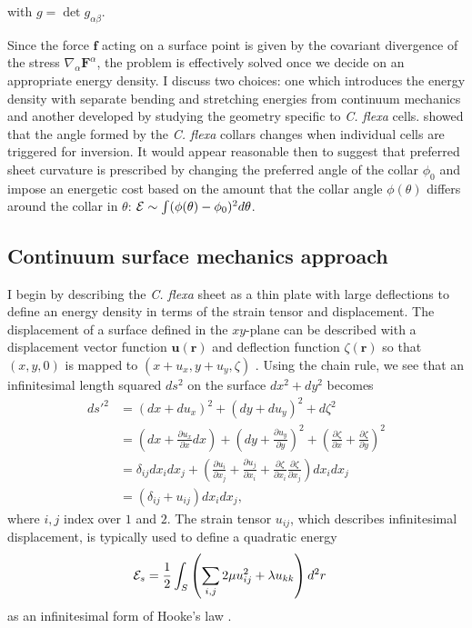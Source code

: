 \noindent with $g = \det{g_{\alpha\beta}}$.

Since the force $\bm{f}$ acting on a surface point is given by the covariant divergence of the stress $\nabla_\alpha \bm{F}^\alpha$, the problem is effectively solved once we decide on an appropriate energy density. 
I discuss two choices: one which introduces the energy density with separate bending and stretching energies from continuum mechanics and another developed by studying the geometry specific to \textit{C. flexa} cells.
\citet{brunet2019} showed that the angle formed by the \textit{C. flexa} collars changes when individual cells are triggered for inversion. 
It would appear reasonable then to suggest that preferred sheet curvature is prescribed by changing the preferred angle of the collar $\phi_0$ and impose an energetic cost based on the amount that the collar angle $\phi(\theta)$ differs around the collar in $\theta$: $\mathcal{E} \sim \int (\phi(\theta) - \phi_0)^2 d\theta$.

\subsection{Continuum surface mechanics approach} \label{subsec:cts}

I begin by describing the \textit{C. flexa} sheet as a thin plate with large deflections to define an energy density in terms of the strain tensor and displacement.
The displacement of a surface defined in the $xy$-plane can be described with a displacement vector function $\bm{u}(\bm{r})$ and deflection function $\zeta(\bm{r})$ so that $(x, y, 0)$ is mapped to $(x + u_x, y + u_y, \zeta)$ \citep{landau1986}.
Using the chain rule, we see that an infinitesimal length squared $ds^2$ on the surface $dx^2 + dy^2$ becomes 
\begin{align*}
	d{s'}^2 &= (dx + du_x)^2 + (dy + du_y)^2 + d\zeta^2 \\
	&= \left(dx + \frac{\partial u_x}{\partial x} dx\right)+ \left(dy + \frac{\partial u_y}{\partial y} \right)^2 + \left(\frac{\partial\zeta}{\partial x} + \frac{\partial\zeta}{\partial y} \right)^2 \\
	&= \delta_{ij} dx_i dx_j + \left(\frac{\partial u_i}{\partial x_j} + \frac{\partial u_j}{\partial x_i} + \frac{\partial \zeta}{\partial x_i} \frac{\partial \zeta}{\partial x_j}\right) dx_i dx_j \\
	&= (\delta_{ij} + u_{ij}) dx_i dx_j,
\end{align*}
where $i,j$ index over $1$ and $2$. The strain tensor $u_{ij}$, which describes infinitesimal displacement, is typically used to define a quadratic energy 
\begin{align}
	\mathcal{E}_s &= \frac{1}{2} \int_S \left( \sum_{i,j}2\mu u_{ij}^2 + \lambda u_{kk} \right) d^2r \label{eq:stretch}
\end{align}
as an infinitesimal form of Hooke's law \citep{landau1986}. 


